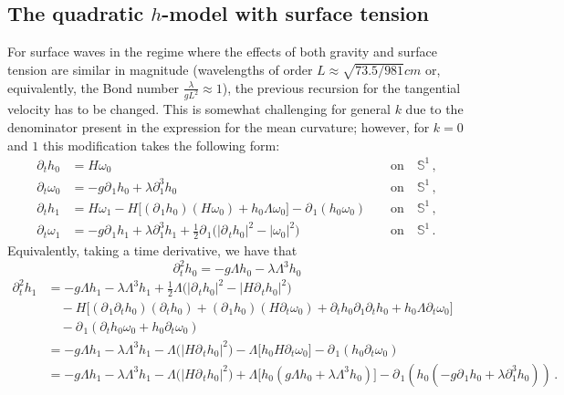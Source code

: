 \documentclass[11pt]{article}
\theoremstyle{plain}
\theoremstyle{definition}
\theoremstyle{definition}
\def\p{\text{\bf\emph{p}}}
\def\p{{\partial\hspace{1pt}}}
\begin{document}
\subsection{The quadratic $h$-model with surface tension}\label{sectionST}For surface waves in the regime where the effects of both gravity and surface tension are similar in magnitude (wavelengths of order $L\approx\sqrt{73.5/981}cm$ or, equivalently, the Bond number $\frac{\lambda}{gL^2}\approx 1$), the previous recursion for the tangential velocity has to be changed. This is somewhat challenging for  general $k$ due to the denominator present in the expression for the  mean curvature;  however, for $k=0$ and $1$ this modification takes the following form:
\begin{subequations}
\label{w0w1surface}
\begin{alignat}{2}
\partial_t h_{0} &= H \omega_0 &&\text{ on}\quad\mathbb{S}^1\,,\\
\partial_t\omega_{0} &= -g \p_{\!1} h_0+\lambda \partial_1^3 h_0&&\text{ on}\quad\mathbb{S}^1\,,\\
\partial_t h_{1} &= H \omega_1- H\big[(\p_{\!1}h_0)(H \omega_0) + h_0 \Lambda \omega_0 \big] - \p_{\!1} (h_0 \omega_0) &&\text{ on}\quad\mathbb{S}^1\,,\\
\partial_t\omega_{1} &= -g \p_{\!1} h_1+\lambda \partial_1^3 h_1 + \frac{1}{2} \p_{\!1} \big(|\p_t h_0|^2 - |\omega_0|^2 \big) \quad&&\text{ on}\quad\mathbb{S}^1\,.
\end{alignat}
\end{subequations}
Equivalently, taking a time derivative, we have that
$$
\partial_t^2 h_{0} = -g \Lambda h_0-\lambda \Lambda^3 h_0
$$
\begin{align*}
\partial_t^2 h_{1} &= -g \Lambda h_1-\lambda \Lambda^3 h_1 + \frac{1}{2} \Lambda \big(|\p_t h_0|^2 - |H\p_t h_0|^2 \big)\\
&\quad- H\big[(\p_{\!1}\partial_t h_0)(\partial_t h_0)+(\p_{\!1}h_0)(H \partial_t \omega_0) + \partial_t h_0 \partial_1\partial_t h_0+h_0 \Lambda \partial_t \omega_0 \big] \\
&\quad - \p_{\!1} (\partial_th_0 \omega_0+h_0 \partial_t\omega_0)\\
&= -g \Lambda h_1-\lambda \Lambda^3 h_1 - \Lambda \big(|H\p_t h_0|^2 \big)- \Lambda\big[h_0 H \partial_t \omega_0 \big] - \p_{\!1} (h_0 \partial_t\omega_0)\\
&= -g \Lambda h_1-\lambda \Lambda^3 h_1 - \Lambda \big(|H\p_t h_0|^2 \big)+ \Lambda\big[h_0 \left(g \Lambda h_0+\lambda \Lambda^3 h_0\right) \big] - \p_{\!1} \left(h_0 \left(-g \p_{\!1} h_0+\lambda \partial_1^3 h_0\right)\right)\,.
\end{align*}
\end{document}
